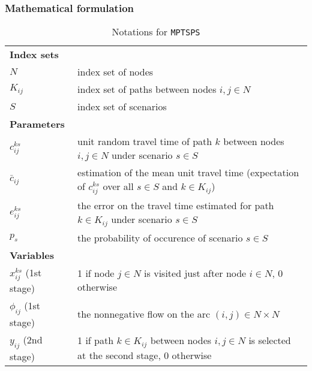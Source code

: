 \subsubsection{Mathematical formulation}
\begin{table}[H]
	\caption{Notations for \texttt{MPTSPS}}
	\label{notation}
	\resizebox{\textwidth}{!}
	{
		\begin{tabular}{ll}
			\toprule
			\textbf{Index sets} &  \\ 
			$N$ & \textrm{index set of nodes} \\ 
			$K_{ij}$ & \textrm{index set of paths between nodes $i,j\in N$} \\ 
			$S$ & \textrm{index set of scenarios}\\
			\textbf{Parameters} &   \\ 
			$c_{ij}^{ks}$ & \textrm{unit random travel time of path $k$ between nodes $i,j\in N$ under scenario $s\in S$} \\ 
			$\bar{c}_{ij}$ & \textrm{estimation of the mean unit travel time (expectation of $c_{ij}^{ks}$ over all $s\in S$ and $k\in K_{ij}$)} \\ 
			$e_{ij}^{ks}$ & \textrm{the error on the travel time estimated for path $k\in K_{ij}$ under scenario $s\in S$} \\ 
			$p_{s}$ & \textrm{the probability of occurence of scenario $s\in S$} \\ 
			\textbf{Variables} &  \\ 
			$x_{ij}^{ks}$ (1st stage) & \textrm{1 if node $j\in N$ is visited just after node $i\in N$, 0 otherwise} \\ 
			$\phi_{ij}$ (1st stage) & \textrm{the nonnegative flow on the arc $(i,j)\in N\times N$}\\
			$y_{ij}$ (2nd stage)& \textrm{1 if path $k\in K_{ij}$ between nodes $i,j\in N$ is selected at the second stage, 0 otherwise} \\ 

			\hline
		\end{tabular}
 	}
\end{table} 

